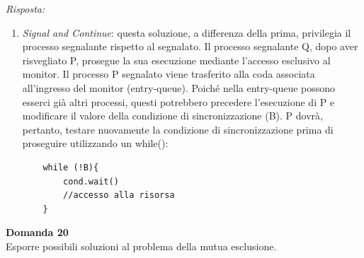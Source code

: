 \documentclass{article}
\newenvironment{problem}[2][Domanda]
    { \begin{mdframed}[backgroundcolor=gray!20] \textbf{#1 #2} \\}
    {  \end{mdframed}}
\newenvironment{solution}
    {\textit{Risposta:}}
    {}
\begin{document}
\begin{solution}
\begin{enumerate}
    \item  \emph{Signal and Continue}: questa soluzione, a differenza della prima, privilegia il processo segnalante rispetto al segnalato. Il processo segnalante Q, dopo aver risvegliato P, prosegue la sua esecuzione mediante l’accesso esclusivo al monitor. Il processo P segnalato viene trasferito alla coda associata all’ingresso del monitor (entry-queue).
    \newline
    Poiché nella entry-queue possono esserci già altri processi, questi potrebbero precedere l’esecuzione di P e modificare il valore della condizione di sincronizzazione (B). 
    \newline
    P dovrà, pertanto, testare nuovamente la condizione di sincronizzazione prima di proseguire utilizzando un while():
    \begin{verbatim}
    while (!B){
        cond.wait()
        //accesso alla risorsa
    }
    \end{verbatim}
    \end{enumerate}
\end{solution}
\begin{problem}{20}
Esporre possibili soluzioni al problema della mutua esclusione.
\end{problem}
\end{document}
